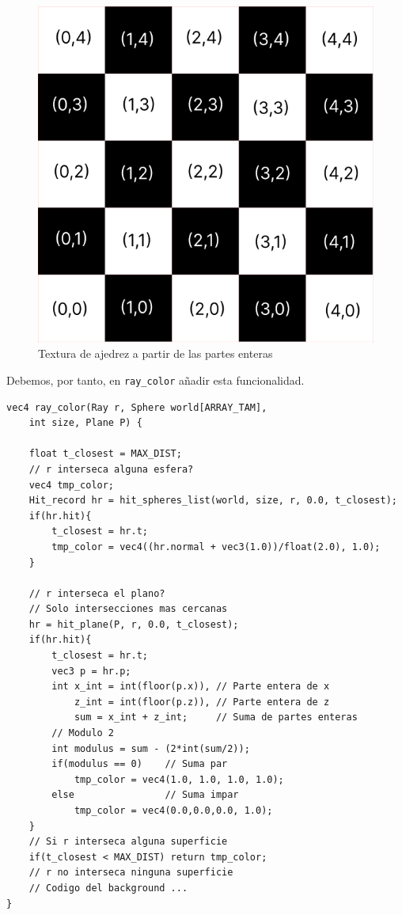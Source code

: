 \begin{figure} [ht]
    \centering
    \includegraphics[scale = 0.25]{img/C8/ajedrez.png}
    \caption{Textura de ajedrez a partir de las partes enteras}
    \label{fig:ajedrez}
\end{figure}

Debemos, por tanto, en \verb|ray_color| añadir esta funcionalidad.

\begin{lstlisting}
vec4 ray_color(Ray r, Sphere world[ARRAY_TAM], 
    int size, Plane P) {
    
    float t_closest = MAX_DIST;   
    // r interseca alguna esfera?
    vec4 tmp_color;
    Hit_record hr = hit_spheres_list(world, size, r, 0.0, t_closest);
    if(hr.hit){
        t_closest = hr.t;
        tmp_color = vec4((hr.normal + vec3(1.0))/float(2.0), 1.0);
    }

    // r interseca el plano?
    // Solo intersecciones mas cercanas
    hr = hit_plane(P, r, 0.0, t_closest);
    if(hr.hit){
        t_closest = hr.t;
        vec3 p = hr.p;
        int x_int = int(floor(p.x)), // Parte entera de x
            z_int = int(floor(p.z)), // Parte entera de z
            sum = x_int + z_int;     // Suma de partes enteras
        // Modulo 2
        int modulus = sum - (2*int(sum/2));
        if(modulus == 0)    // Suma par
            tmp_color = vec4(1.0, 1.0, 1.0, 1.0);
        else                // Suma impar
            tmp_color = vec4(0.0,0.0,0.0, 1.0);
    }
    // Si r interseca alguna superficie
    if(t_closest < MAX_DIST) return tmp_color;
    // r no interseca ninguna superficie
    // Codigo del background ... 
}
\end{lstlisting}

